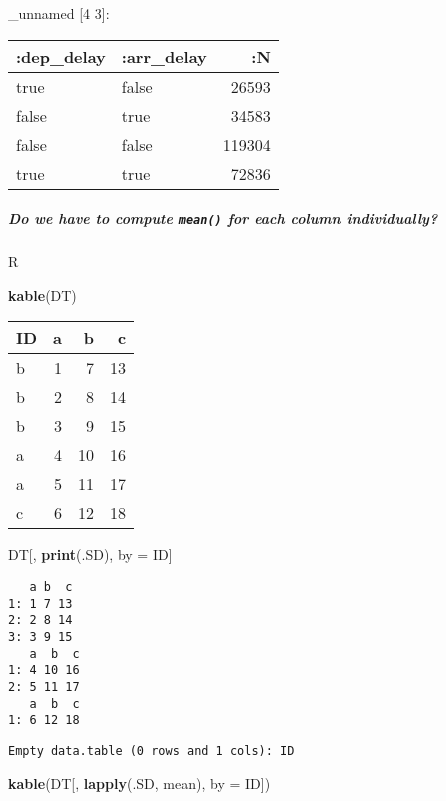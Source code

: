 \documentclass[]{article}
\newenvironment{Shaded}{\begin{snugshade}}{\end{snugshade}}
\newcommand{\KeywordTok}[1]{\textcolor[rgb]{0.13,0.29,0.53}{\textbf{#1}}}
\newcommand{\DataTypeTok}[1]{\textcolor[rgb]{0.13,0.29,0.53}{#1}}
\newcommand{\StringTok}[1]{\textcolor[rgb]{0.31,0.60,0.02}{#1}}
\newcommand{\NormalTok}[1]{#1}
\let\oldsubparagraph\subparagraph
\renewcommand{\subparagraph}[1]{\oldsubparagraph{#1}\mbox{}}
\begin{document}
\_unnamed {[}4 3{]}:

\begin{longtable}[]{@{}llr@{}}
\toprule
:dep\_delay & :arr\_delay & :N\tabularnewline
\midrule
\endhead
true & false & 26593\tabularnewline
false & true & 34583\tabularnewline
false & false & 119304\tabularnewline
true & true & 72836\tabularnewline
\bottomrule
\end{longtable}

\subparagraph{\texorpdfstring{Do we have to compute \texttt{mean()} for
each column
individually?}{Do we have to compute mean() for each column individually?}}\label{do-we-have-to-compute-mean-for-each-column-individually}

R

\begin{Shaded}
\begin{Highlighting}[]
\KeywordTok{kable}\NormalTok{(DT)}
\end{Highlighting}
\end{Shaded}

\begin{longtable}[]{@{}lrrr@{}}
\toprule
ID & a & b & c\tabularnewline
\midrule
\endhead
b & 1 & 7 & 13\tabularnewline
b & 2 & 8 & 14\tabularnewline
b & 3 & 9 & 15\tabularnewline
a & 4 & 10 & 16\tabularnewline
a & 5 & 11 & 17\tabularnewline
c & 6 & 12 & 18\tabularnewline
\bottomrule
\end{longtable}

\begin{Shaded}
\begin{Highlighting}[]
\NormalTok{DT[, }\KeywordTok{print}\NormalTok{(.SD), by =}\StringTok{ }\NormalTok{ID]}
\end{Highlighting}
\end{Shaded}

\begin{verbatim}
   a b  c
1: 1 7 13
2: 2 8 14
3: 3 9 15
   a  b  c
1: 4 10 16
2: 5 11 17
   a  b  c
1: 6 12 18
\end{verbatim}

\begin{verbatim}
Empty data.table (0 rows and 1 cols): ID
\end{verbatim}

\begin{Shaded}
\begin{Highlighting}[]
\KeywordTok{kable}\NormalTok{(DT[, }\KeywordTok{lapply}\NormalTok{(.SD, mean), }\DataTypeTok{by =}\NormalTok{ ID])}
\end{Highlighting}
\end{Shaded}
\end{document}
